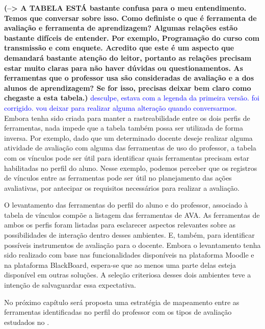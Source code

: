 \textbf{(--> A TABELA ESTÁ bastante confusa para o meu entendimento. Temos que conversar sobre isso. Como definiste o que é ferramenta de avaliação e ferramenta de aprendizagem? Algumas relações estão bastante difíceis de entender. Por exemplo, Programação do curso com transmissão e com enquete. Acredito que este é um aspecto que demandará bastante atenção do leitor, portanto as relações precisam estar muito claras para não haver dúvidas ou questionamentos. As ferramentas que o professor usa são consideradas de avaliação e a dos alunos de aprendizagem? Se for isso, precisas deixar bem claro como chegaste a esta tabela.)}  \textcolor{blue} {desculpe, estava com a legenda da primeira versão. foi corrigido. vou deixar para realizar alguma alteração quando conversarmos.}
Embora tenha sido criada para manter a rastreabilidade entre os dois perfis de ferramentas, nada impede que a tabela também possa ser utilizada de forma inversa. Por exemplo, dado que um determinado docente deseje realizar alguma atividade de avaliação com alguma das ferramentas de uso do professor, a tabela com os vínculos pode ser útil para identificar quais ferramentas precisam estar habilitadas no perfil do aluno. Nesse exemplo, podemos perceber que os registros de vínculos entre as ferramentas pode ser útil no planejamento das ações avaliativas, por antecipar os requisitos necessários para realizar a avaliação.

O levantamento das ferramentas do perfil do aluno e do professor, associado à tabela de vínculos compõe a listagem das ferramentas de AVA. As ferramentas de ambos os perfis foram listadas para esclarecer aspectos relevantes sobre as possibilidades de interação dentro desses ambientes. E, também, para identificar possíveis instrumentos de avaliação para o docente. Embora o levantamento tenha sido realizado com base nas funcionalidades disponíveis na plataforma Moodle e na plataforma BlackBoard, espera-se que ao menos uma parte delas esteja disponível em outras soluções. A seleção criteriosa desses dois ambientes teve a intenção de salvaguardar essa expectativa.

No próximo capítulo será proposta uma estratégia de mapeamento entre as ferramentas identificadas no perfil do professor com os tipos de avaliação estudados no .


